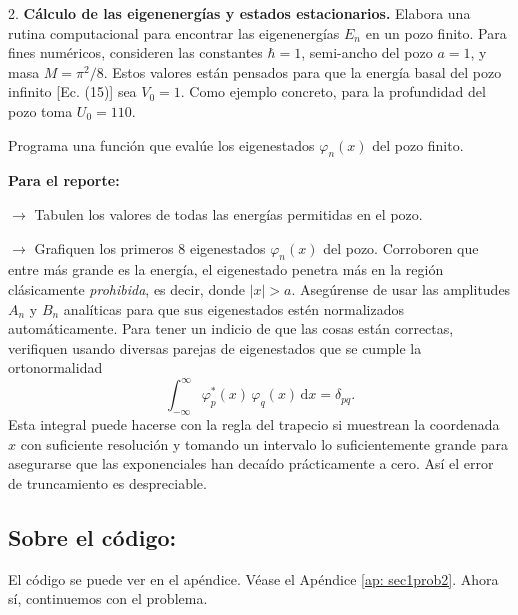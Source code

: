 \begin{pregunta}{2.}
\textbf{Cálculo de las eigenenergías y estados estacionarios.} Elabora una rutina computacional para encontrar las eigenenergías $E_n$ en un pozo finito. Para fines numéricos, consideren las constantes $\hbar = 1$, semi-ancho del pozo $a = 1$, y masa $M = \pi^2/8$. Estos valores están pensados para que la energía basal del pozo infinito [Ec. (15)] sea $V_0 = 1$. Como ejemplo concreto, para la profundidad del pozo toma $U_0 = 110$.
 
Programa una función que evalúe los eigenestados $\varphi_n(x)$ del pozo finito.
 
\textbf{Para el reporte:}
 
$\rightarrow$ Tabulen los valores de todas las energías permitidas en el pozo.
 
$\rightarrow$ Grafiquen los primeros 8 eigenestados $\varphi_n(x)$ del pozo. Corroboren que entre más grande es la energía, el eigenestado penetra más en la región clásicamente \textit{prohibida}, es decir, donde $|x| > a$. Asegúrense de usar las amplitudes $A_n$ y $B_n$ analíticas para que sus eigenestados estén normalizados automáticamente. Para tener un indicio de que las cosas están correctas, verifiquen usando diversas parejas de eigenestados que se cumple la ortonormalidad
\begin{equation}
\int_{-\infty}^{\infty} \varphi_p^{*}(x) \, \varphi_q(x) \, \mathrm{d}x = \delta_{pq}. \tag{1}
\end{equation}
Esta integral puede hacerse con la regla del trapecio si muestrean la coordenada $x$ con suficiente resolución y tomando un intervalo lo suficientemente grande para asegurarse que las exponenciales han decaído prácticamente a cero. Así el error de truncamiento es despreciable.
\end{pregunta}

\subsection*{Sobre el código:}

El código se puede ver en el apéndice. Véase el Apéndice \ref{ap: sec1prob2}. Ahora sí, continuemos con el problema.
\\ 

